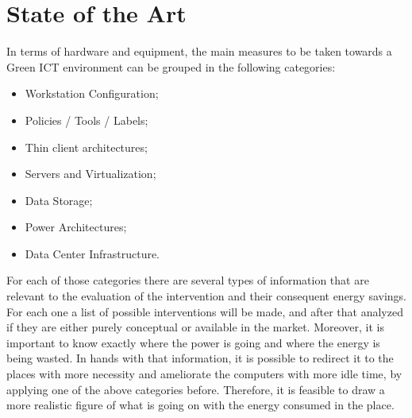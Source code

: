 

\chapter{State of the Art} \label{chap2:state_of_the_art}
    In terms of hardware and equipment, the main measures to be taken towards a Green ICT environment can be grouped in the following categories:%
    \begin{itemize}
        \item Workstation Configuration;
        \item Policies / Tools / Labels;
        \item Thin client architectures;
        \item Servers and Virtualization;
        \item Data Storage;
        \item Power Architectures;
        \item Data Center Infrastructure.
    \end{itemize}

    For each of those categories there are several types of information that are relevant to the evaluation of the intervention and their consequent energy savings. For each one a list of possible interventions will be made, and after that analyzed if they are either purely conceptual or available in the market. Moreover, it is important to know exactly where the power is going and where the energy is being wasted. In hands with that information, it is possible to redirect it to the places with more necessity and ameliorate the computers with more idle time, by applying one of the above categories before. Therefore, it is feasible to draw a more realistic figure of what is going on with the energy consumed in the place.

